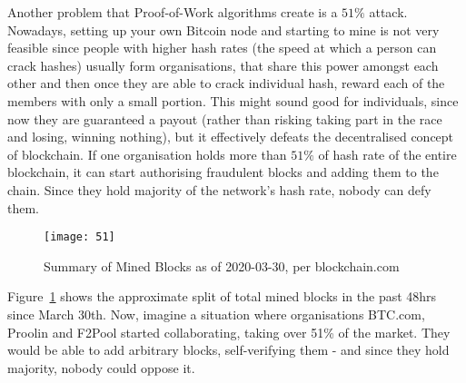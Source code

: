 Another problem that Proof-of-Work algorithms create is a $51\%$ attack. Nowadays, setting up your own Bitcoin node and starting to mine is not very feasible since people with higher hash rates (the speed at which a person can crack hashes) usually form organisations, that share this power amongst each other and then once they are able to crack individual hash, reward each of the members with only a small portion. This might sound good for individuals, since now they are guaranteed a payout (rather than risking taking part in the race and losing, winning nothing), but it effectively defeats the decentralised concept of blockchain. If one organisation holds more than $51\%$ of hash rate of the entire blockchain, it can start authorising fraudulent blocks and adding them to the chain. Since they hold majority of the network's hash rate, nobody can defy them. 

\begin{figure}[ht]
    \centering
    \texttt{[image: 51]}
    \caption{Summary of Mined Blocks as of 2020-03-30, per blockchain.com}
    \label{fig:51}
\end{figure}

Figure~\ref{fig:51} shows the approximate split of total mined blocks in the past 48hrs since March 30th. Now, imagine a situation where organisations BTC.com, Proolin and F2Pool started collaborating, taking over 51\% of the market. They would be able to add arbitrary blocks, self-verifying them - and since they hold majority, nobody could oppose it.
